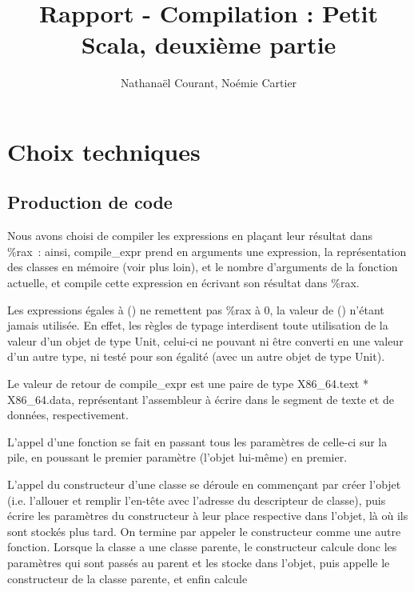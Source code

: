 \documentclass[a4paper,10pt]{article}
\title{Rapport - Compilation : Petit Scala, deuxième partie}
\author{Nathanaël Courant, Noémie Cartier}
\newcommand{\code}[1]{{\fontfamily{pcr}\selectfont #1}}
\begin{document}
\maketitle

\section*{Choix techniques}

\subsection*{Production de code}

Nous avons choisi de compiler les expressions en plaçant leur résultat
dans \code{\%{}rax}~: ainsi, \code{compile\_{}expr} prend
en arguments une expression, la représentation des classes en mémoire
(voir plus loin), et le nombre d'arguments de la fonction actuelle, et
compile cette expression en écrivant son résultat dans
\code{\%{}rax}. \\ \par
Les expressions égales à \code{()} ne remettent pas \code{\%{}rax} à
$0$, la valeur de \code{()} n'étant jamais utilisée. En effet, les
règles de typage interdisent toute utilisation de la valeur d'un objet
de type \code{Unit}, celui-ci ne pouvant ni être converti en une
valeur d'un autre type, ni testé pour son égalité (avec un autre objet
de type \code{Unit}). \\ \par
Le valeur de retour de \code{compile\_{}expr} est une paire de type
\code{X86\_{}64.text * X86\_{}64.data}, représentant l'assembleur à
écrire dans le segment de texte et de données, respectivement. \\ \par
L'appel d'une fonction se fait en passant tous les paramètres de
celle-ci sur la pile, en poussant le premier paramètre (l'objet
lui-même) en premier. \\ \par
L'appel du constructeur d'une classe se déroule en commençant par
créer l'objet (i.e. l'allouer et remplir l'en-tête avec l'adresse du
descripteur de classe), puis écrire les paramètres du constructeur à
leur place respective dans l'objet, là où ils sont stockés plus
tard. On termine par appeler le constructeur comme une autre fonction.
Lorsque la classe a une classe parente, le constructeur calcule donc
les paramètres qui sont passés au parent et les stocke dans l'objet,
puis appelle le constructeur de la classe parente, et enfin calcule
\end{document}
